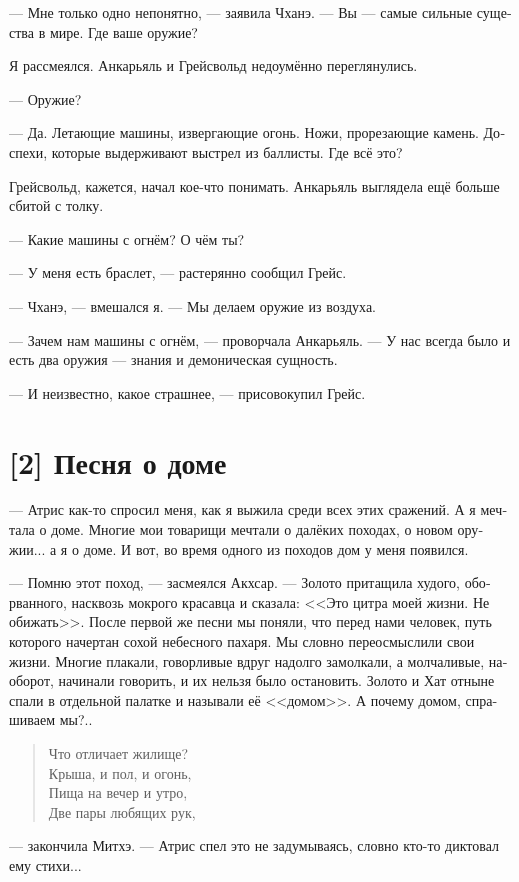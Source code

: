 \documentclass[a4paper,12pt,fleqn]{book}\usepackage{polyglossia}\setdefaultlanguage[babelshorthands=true]{russian}\setotherlanguage{english}\defaultfontfeatures{Ligatures=TeX,Mapping=tex-text}\usepackage{xcolor}\newcommand{\ml}[3]{#2}
\begin{document}
{--- Мне только одно непонятно, --- заявила Чханэ.
--- Вы --- самые сильные существа в мире.
Где ваше оружие?

Я рассмеялся.
Анкарьяль и Грейсвольд недоумённо переглянулись.

--- Оружие?

--- Да.
Летающие машины, извергающие огонь.
Ножи, прорезающие камень.
Доспехи, которые выдерживают выстрел из баллисты.
Где всё это?

Грейсвольд, кажется, начал кое-что понимать.
Анкарьяль выглядела ещё больше сбитой с толку.

--- Какие машины с огнём?
О чём ты?

--- У меня есть браслет, --- растерянно сообщил Грейс.

--- Чханэ, --- вмешался я.
--- Мы делаем оружие из воздуха.

--- Зачем нам машины с огнём, --- проворчала Анкарьяль.
--- У нас всегда было и есть два оружия --- знания и демоническая сущность.

--- И неизвестно, какое страшнее, --- присовокупил Грейс.

\section{[2] Песня о доме}

--- Атрис как-то спросил меня, как я выжила среди всех этих сражений.
А я мечтала о доме.
Многие мои товарищи мечтали о далёких походах, о новом оружии... а я о доме.
И вот, во время одного из походов дом у меня появился.

--- Помню этот поход, --- засмеялся Акхсар.
--- Золото притащила худого, оборванного, насквозь мокрого красавца и сказала: <<Это цитра моей жизни.
Не обижать>>.
После первой же песни мы поняли, что перед нами человек, путь которого начертан сохой небесного пахаря.
Мы словно переосмыслили свои жизни.
Многие плакали, говорливые вдруг надолго замолкали, а молчаливые, наоборот, начинали говорить, и их нельзя было остановить.
Золото и Хат отныне спали в отдельной палатке и называли её <<домом>>.
А почему домом, спрашиваем мы?..

\begin{verse}
Что отличает жилище?\\
Крыша, и пол, и огонь,\\
Пища на вечер и утро,\\
Две пары любящих рук,
\end{verse}

--- закончила Митхэ.
--- Атрис спел это не задумываясь, словно кто-то диктовал ему стихи...

}
\end{document}
